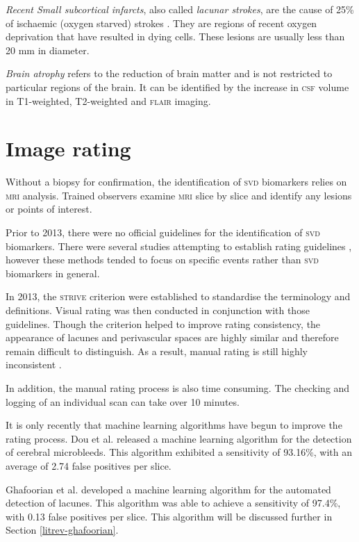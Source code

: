 \textit{Recent Small subcortical infarcts}, also called \textit{lacunar strokes}, are the cause of 25\% of ischaemic (oxygen starved) strokes \cite{WardlawJ.M.2013Nsfr}. They are regions of recent oxygen deprivation that have resulted in dying cells. These lesions are usually less than 20 mm in diameter. 

\textit{Brain atrophy} refers to the reduction of brain matter and is not restricted to particular regions of the brain. It can be identified by the increase in \textsc{csf} volume in T1-weighted, T2-weighted and \textsc{flair} imaging.

\section{Image rating}\label{svd-rating}

Without a biopsy for confirmation, the identification of \textsc{svd} biomarkers relies on \textsc{mri} analysis. Trained observers examine \textsc{mri} slice by slice and identify any lesions or points of interest.

Prior to 2013, there were no official guidelines for the identification of \textsc{svd} biomarkers. There were several studies attempting to establish rating guidelines \cite{AdamsH.H.Hieab2013RMfD, PotterGillian2015CPSV}, however these methods tended to focus on specific events rather than \textsc{svd} biomarkers in general.


In 2013, the \textsc{strive} criterion \cite{WardlawJ.M.2013Nsfr} were established to standardise the terminology and definitions. Visual rating was then conducted in conjunction with those guidelines. Though the criterion helped to improve rating consistency, the appearance of lacunes and perivascular spaces are highly similar and therefore remain difficult to distinguish. As a result, manual rating is still highly inconsistent \cite{PotterGillian2015CPSV}. 

In addition, the manual rating process is also time consuming. The checking and logging of an individual scan can take over 10 minutes.

It is only recently that machine learning algorithms have begun to improve the rating process. Dou et al. \cite{DouQ.2016ADoC} released a machine learning algorithm for the detection of cerebral microbleeds. This algorithm exhibited a sensitivity of 93.16\%, with an average of 2.74 false positives per slice. 

Ghafoorian et al. \cite{GhafoorianM.2017Dml3} developed a machine learning algorithm for the automated detection of lacunes. This algorithm was able to achieve a sensitivity of 97.4\%, with 0.13 false positives per slice. This algorithm will be discussed further in Section \ref{litrev-ghafoorian}.


%